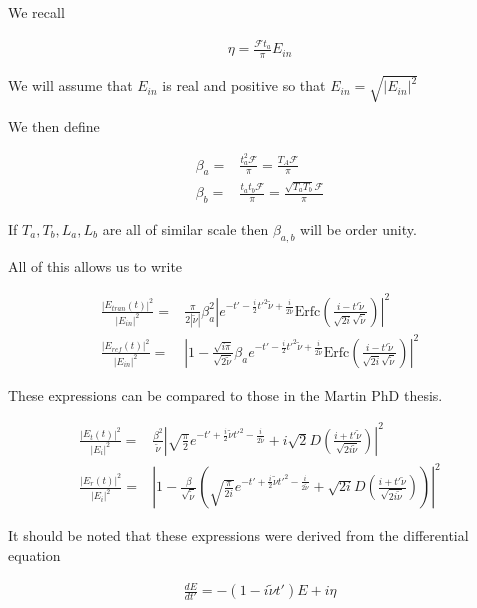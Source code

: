 \documentclass[12pt]{article}
\begin{document}
We recall

\begin{align}
\eta = \frac{\mathcal{F}t_a}{\pi} E_{in}
\end{align}

We will assume that $E_{in}$ is real and positive so that $E_{in} = \sqrt{|E_{in}|^2}$

We then define

\begin{align}
\beta_a =& \frac{t_a^2\mathcal{F}}{\pi} = \frac{T_A\mathcal{F}}{\pi}\\
\beta_b =& \frac{t_at_b\mathcal{F}}{\pi} = \frac{\sqrt{T_aT_b}\mathcal{F}}{\pi}
\end{align}

If $T_a, T_b, L_a, L_b$ are all of similar scale then $\beta_{a,b}$ will be order unity.

All of this allows us to write

\begin{align}
\frac{|E_{tran}(t)|^2}{|E_{in}|^2} =& \frac{\pi}{2|\tilde{\nu}|} \beta_a^2 \left\lvert  e^{-t' - \frac{i}{2}t'^2 \tilde{\nu} + \frac{i}{2\tilde{\nu}}} \text{Erfc}\left(\frac{i-t'\tilde{\nu}}{\sqrt{2i}\sqrt{\tilde{\nu}}}\right)\right\rvert^2\\
\frac{|E_{ref}(t)|^2}{|E_{in}|^2} =& \left\lvert 1 - \frac{\sqrt{i\pi}}{\sqrt{2\tilde{\nu}}} \beta_a e^{-t' - \frac{i}{2}t'^2 \tilde{\nu} + \frac{i}{2\tilde{\nu}}} \text{Erfc}\left(\frac{i-t'\tilde{\nu}}{\sqrt{2i}\sqrt{\tilde{\nu}}}\right)\right\rvert^2
\end{align}

These expressions can be compared to those in the Martin PhD thesis.

\begin{align}
\frac{|E_{t}(t)|^2}{|E_i|^2} =& \frac{\beta^2}{\tilde{\nu}} \left\lvert \sqrt{\frac{\pi}{2}} e^{-t' + \frac{i}{2}\tilde{\nu}t'^2 - \frac{i}{2\tilde{\nu}}} + i\sqrt{2}D\left(\frac{i+t'\tilde{\nu}}{\sqrt{2i\tilde{\nu}}}\right)\right \rvert^2\\
\frac{|E_r(t)|^2}{|E_i|^2} =& \left \lvert 1- \frac{\beta}{\sqrt{\tilde{\nu}}}\left(\sqrt{\frac{\pi}{2i}} e^{-t' + \frac{i}{2}\tilde{\nu}t'^2 - \frac{i}{2\tilde{\nu}}} + \sqrt{2i}D\left(\frac{i+t'\tilde{\nu}}{\sqrt{2i\tilde{\nu}}}\right)\right)\right\rvert^2
\end{align}

It should be noted that these expressions were derived from the differential equation

\begin{align}
\frac{dE}{dt'} = -(1-i\tilde{\nu}t')E + i \eta
\end{align}
\end{document}
